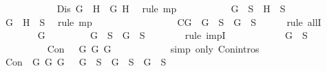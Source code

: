 \begin{isabellebody}
\ \ \ \ \ \ \ \ \ \ \isamarkupfalse%
\ {\isacartoucheopen}Dis\ {\isacharparenleft}G\ \isactrlbold {\isasymrightarrow}\ H{\isacharparenright}\ {\isacharparenleft}\isactrlbold {\isasymnot}\ G{\isacharparenright}\ H{\isacartoucheclose}\ \isamarkupfalse%
\ {\isacharparenleft}rule\ mp{\isacharparenright}\isanewline
\ \ \ \ \ \ \ \ \isamarkupfalse%
\ {\isachardoublequoteopen}\isactrlbold {\isasymnot}\ G\ {\isasymin}\ S\ {\isasymor}\ H\ {\isasymin}\ S{\isachardoublequoteclose}\isanewline
\ \ \ \ \ \ \ \ \ \ \isamarkupfalse%
\ {\isacartoucheopen}G\ \isactrlbold {\isasymrightarrow}\ H\ {\isasymin}\ S{\isacartoucheclose}\ \isamarkupfalse%
\ {\isacharparenleft}rule\ mp{\isacharparenright}\isanewline
\ \ \ \ \ \ \isamarkupfalse%
\isanewline
\ \ \ \ \isamarkupfalse%
\isanewline
\ \ \ \ \isamarkupfalse%
\ C{}{\isacharcolon}{\isachardoublequoteopen}{\isasymforall}G{\isachardot}\ \isactrlbold {\isasymnot}{\isacharparenleft}\isactrlbold {\isasymnot}\ G{\isacharparenright}\ {\isasymin}\ S\ {\isasymlongrightarrow}\ G\ {\isasymin}\ S{\isachardoublequoteclose}\isanewline
\ \ \ \ \isamarkupfalse%
\ {\isacharparenleft}rule\ allI{\isacharparenright}\isanewline
\ \ \ \ \ \ \isamarkupfalse%
\ G\isanewline
\ \ \ \ \ \ \isamarkupfalse%
\ {\isachardoublequoteopen}\isactrlbold {\isasymnot}{\isacharparenleft}\isactrlbold {\isasymnot}\ G{\isacharparenright}\ {\isasymin}\ S\ {\isasymlongrightarrow}\ G\ {\isasymin}\ S{\isachardoublequoteclose}\isanewline
\ \ \ \ \ \ \isamarkupfalse%
\ {\isacharparenleft}rule\ impI{\isacharparenright}\isanewline
\ \ \ \ \ \ \ \ \isamarkupfalse%
\ {\isachardoublequoteopen}\isactrlbold {\isasymnot}\ {\isacharparenleft}\isactrlbold {\isasymnot}\ G{\isacharparenright}\ {\isasymin}\ S{\isachardoublequoteclose}\ \isanewline
\ \ \ \ \ \ \ \ \isamarkupfalse%
\ {\isachardoublequoteopen}Con\ {\isacharparenleft}\isactrlbold {\isasymnot}\ {\isacharparenleft}\isactrlbold {\isasymnot}\ G{\isacharparenright}{\isacharparenright}\ G\ G{\isachardoublequoteclose}\isanewline
\ \ \ \ \ \ \ \ \ \ \isamarkupfalse%
\ {\isacharparenleft}simp\ only{\isacharcolon}\ Con{\isachardot}intros{\isacharparenleft}{}{\isacharparenright}{\isacharparenright}\isanewline
\ \ \ \ \ \ \ \ \isamarkupfalse%
\ {\isachardoublequoteopen}Con\ {\isacharparenleft}\isactrlbold {\isasymnot}{\isacharparenleft}\isactrlbold {\isasymnot}\ G{\isacharparenright}{\isacharparenright}\ G\ G\ {\isasymlongrightarrow}\ {\isacharparenleft}\isactrlbold {\isasymnot}{\isacharparenleft}\isactrlbold {\isasymnot}\ G{\isacharparenright}{\isacharparenright}\ {\isasymin}\ S\ {\isasymlongrightarrow}\ G\ {\isasymin}\ S\ {\isasymand}\ G\ {\isasymin}\ S{\isachardoublequoteclose}\isanewline

\end{isabellebody}

